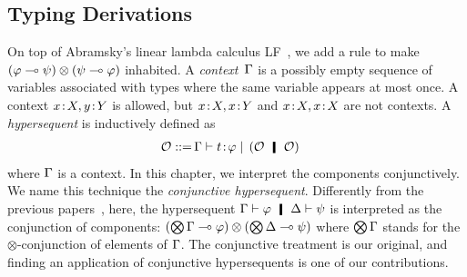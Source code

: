 \subsection{Typing Derivations}

On top of Abramsky's linear lambda calculus
LF~\citep{abramsky1993computational}, we add a rule to
make $(\varphi\multimap\psi)\otimes(\psi\multimap\varphi)$ inhabited. 
A \textit{context}~$\Gamma$ is a possibly empty sequence of
variables associated with
types where the same variable appears at most once.
A context ${x} \mathord{\colon\kern -2pt}{X}, {y} \mathord{\colon\kern -2pt}{Y}$ is allowed, but ${x} \mathord{\colon\kern -2pt}{X}, {x} \mathord{\colon\kern -2pt}{Y}$
and ${x} \mathord{\colon\kern -2pt}{X},{x} \mathord{\colon\kern -2pt}{X}$ are not contexts.
A \textit{hypersequent} is inductively defined as
\begin{align*}
 \hypert ::=\, &\G\tr\tj{t}{\phi}
 \mid\, (\hypert\hmid \hypert)
\end{align*}
where $\Gamma$ is a context.
In this chapter, we interpret the components conjunctively.
We name this technique the \textit{conjunctive
hypersequent}.
Differently from the previous
papers~\citep{avron91,Baaz01122003,avrontableau,avron96},
here, the hypersequent $\G\tr\phi\hmid \D\tr\psi$ is interpreted as the
conjunction of components:
$(\bigotimes\Gamma\multimap\varphi)\otimes (\bigotimes\Delta\multimap\psi)$ where
$\bigotimes\Gamma$ stands for the $\otimes$-conjunction of elements of $\Gamma$.
The conjunctive treatment is our original, and finding an application
of conjunctive hypersequents is one of our contributions.

